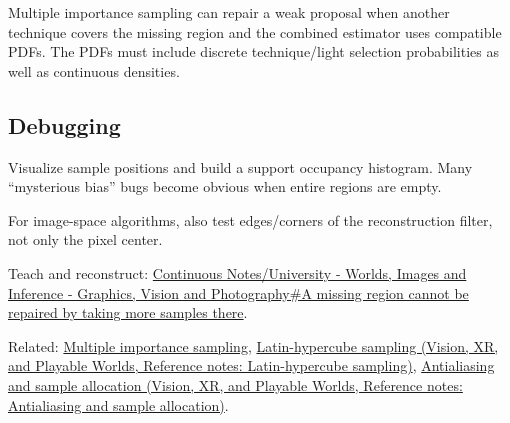 \hypertarget{appendix-10308c3d753e-mis-support}{}

Multiple importance sampling can repair a weak proposal when another technique covers the missing region and the combined estimator uses compatible PDFs. The PDFs must include discrete technique/light selection probabilities as well as continuous densities.

\subsection{Debugging}\label{appendix-10308c3d753e-debugging}

\hypertarget{appendix-10308c3d753e-debugging}{}

Visualize sample positions and build a support occupancy histogram. Many ``mysterious bias'' bugs become obvious when entire regions are empty.

For image-space algorithms, also test edges/corners of the reconstruction filter, not only the pixel center.

Teach and reconstruct: \hyperref[03-visual-computing-i-ch007-a-missing-region-cannot-be-repaired-by-taking-more-samples-there]{Continuous Notes/University - Worlds, Images and Inference - Graphics, Vision and Photography\#A missing region cannot be repaired by taking more samples there}.

Related: \hyperref[appendix-ca8898faf1a6]{Multiple importance sampling}, \href{../07-Vision-XR-and-Playable-Worlds/main.pdf\#nameddest=appendix-1c5e85693a06}{Latin-hypercube sampling (Vision, XR, and Playable Worlds, Reference notes: Latin-hypercube sampling)}, \href{../07-Vision-XR-and-Playable-Worlds/main.pdf\#nameddest=appendix-4192b2bdd21e}{Antialiasing and sample allocation (Vision, XR, and Playable Worlds, Reference notes: Antialiasing and sample allocation)}.
